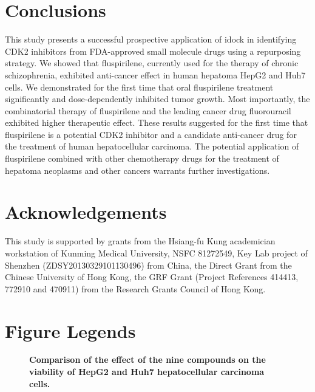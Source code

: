 \documentclass[10pt]{article}
\begin{document}
\section*{Conclusions}

This study presents a successful prospective application of idock \cite{1153,1362} in identifying CDK2 inhibitors from FDA-approved small molecule drugs using a repurposing strategy. We showed that fluspirilene, currently used for the therapy of chronic schizophrenia, exhibited anti-cancer effect in human hepatoma HepG2 and Huh7 cells. We demonstrated for the first time that oral fluspirilene treatment significantly and dose-dependently inhibited tumor growth. Most importantly, the combinatorial therapy of fluspirilene and the leading cancer drug fluorouracil exhibited higher therapeutic effect. These results suggested for the first time that fluspirilene is a potential CDK2 inhibitor and a candidate anti-cancer drug for the treatment of human hepatocellular carcinoma. The potential application of fluspirilene combined with other chemotherapy drugs for the treatment of hepatoma neoplasms and other cancers warrants further investigations.

\section*{Acknowledgements}
This study is supported by grants from the Hsiang-fu Kung academician workstation of Kunming Medical University, NSFC 81272549, Key Lab project of Shenzhen (ZDSY20130329101130496) from China, the Direct Grant from the Chinese University of Hong Kong, the GRF Grant (Project References 414413, 772910 and 470911) from the Research Grants Council of Hong Kong.



\section*{Figure Legends}

\begin{figure}[!ht]
\begin{center}
\end{center}
\caption{
{\bf Comparison of the effect of the nine compounds on the viability of HepG2 and Huh7 hepatocellular carcinoma cells.}
}
\label{CellViabilityAgainstConcentration}
\end{figure}
\end{document}
